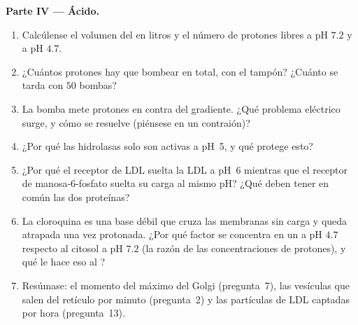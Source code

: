 \begin{problem}
\medskip
\noindent\textbf{Parte IV --- Ácido.}
\begin{enumerate}[resume]
  \item Calcúlense el volumen del  en litros y el número de
        protones libres a pH $7.2$ y a pH $4.7$.
  \item ¿Cuántos protones hay que bombear en total, con el tampón?
        ¿Cuánto se tarda con $50$ bombas?
  \item La bomba mete protones en contra del gradiente. ¿Qué problema
        eléctrico surge, y cómo se resuelve (piénsese en un contraión)?
  \item ¿Por qué las hidrolasas solo son activas a pH~5, y qué protege
        esto?
  \item ¿Por qué el receptor de LDL suelta la LDL a pH~6 mientras que el
        receptor de manosa-6-fosfato suelta su carga al mismo pH? ¿Qué
        deben tener en común las dos proteínas?
  \item La cloroquina es una base débil que cruza las membranas sin
        carga y queda atrapada una vez protonada. ¿Por qué factor se
        concentra en un  a pH $4.7$ respecto al citosol a pH
        $7.2$ (la razón de las concentraciones de protones), y qué le
        hace eso al ?
  \item Resúmase: el momento del máximo del Golgi (pregunta~7), las
        vesículas que salen del retículo por minuto (pregunta~2) y las
        partículas de LDL captadas por hora (pregunta~13).
\end{enumerate}
\end{problem}

